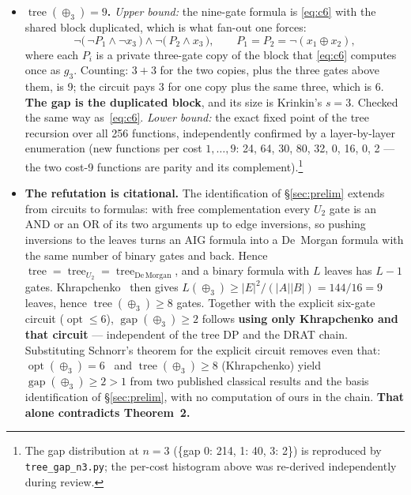 \documentclass[11pt]{article}
\DeclareMathOperator{\opt}{opt}
\DeclareMathOperator{\tree}{tree}
\DeclareMathOperator{\gapop}{gap}
\theoremstyle{plain}
\begin{document}
\begin{itemize}
  \item \textbf{$\tree(\oplus_3) = 9$.} \emph{Upper bound:} the nine-gate formula is
  \eqref{eq:c6} with the shared block duplicated, which is what fan-out one forces:
  \begin{equation}\label{eq:w9}
    \neg\bigl(\,\neg P_1 \wedge \neg x_3\,\bigr) \wedge \neg\bigl(\,P_2 \wedge x_3\,\bigr),
    \qquad P_1 = P_2 = \neg(x_1 \oplus x_2),
  \end{equation}
  where each $P_i$ is a private three-gate copy of the block that \eqref{eq:c6} computes once as
  $g_3$. Counting: $3 + 3$ for the two copies, plus the three gates above them, is 9; the circuit
  pays $3$ for one copy plus the same three, which is 6. \textbf{The gap is the duplicated block},
  and its size is Krinkin's $s = 3$. Checked the same way as~\eqref{eq:c6}. \emph{Lower bound:} the exact fixed point of the tree recursion over all 256
  functions, independently confirmed by a layer-by-layer enumeration (new functions per cost
  $1,\dots,9$: 24, 64, 30, 80, 32, 0, 16, 0, 2 --- the two cost-9 functions are parity and its
  complement).\footnote{The gap distribution at $n = 3$ (\{gap 0: 214, 1: 40, 3: 2\}) is reproduced
  by \texttt{tree\_gap\_n3.py}; the per-cost histogram above was re-derived independently during
  review.}

  \item \textbf{The refutation is citational.} The identification of \S\ref{sec:prelim} extends
  from circuits to formulas: with free complementation every $U_2$ gate is an AND or an OR of its
  two arguments up to edge inversions, so pushing inversions to the leaves turns an AIG formula
  into a De~Morgan formula with the same number of binary gates and back. Hence
  $\tree = \tree_{U_2} = \tree_{\mathrm{De\,Morgan}}$, and a binary formula with $L$ leaves has
  $L-1$ gates. Khrapchenko~\cite{khrapchenko1971} then gives
  $L(\oplus_3) \ge |E|^2/(|A||B|) = 144/16 = 9$ leaves, hence $\tree(\oplus_3) \ge 8$ gates.
  Together with the explicit six-gate circuit ($\opt \le 6$), $\gapop(\oplus_3) \ge 2$ follows
  \textbf{using only Khrapchenko and that circuit} --- independent of the tree DP and the DRAT
  chain. Substituting Schnorr's theorem for the explicit circuit removes even that:
  $\opt(\oplus_3) = 6$~\cite{schnorr1976} and $\tree(\oplus_3) \ge 8$ (Khrapchenko) yield
  $\gapop(\oplus_3) \ge 2 > 1$ from two published classical results and the basis identification
  of \S\ref{sec:prelim}, with no computation of ours in the chain. \textbf{That alone contradicts
  Theorem~2.}


\end{itemize}
\end{document}
